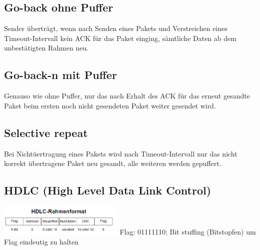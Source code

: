 \documentclass[fs, footer]{latex4ei}
\begin{document}
\begin{multicols*}{4}
{	\subsection{Go-back ohne Puffer} 
		Sender überträgt, wenn nach Senden eines Pakets und Verstreichen eines Timeout-Intervall kein ACK für das Paket einging, sämtliche Daten ab dem unbestätigten Rahmen neu. \\

	\subsection{Go-back-n mit Puffer} 
		Genauso wie ohne Puffer, nur das nach Erhalt des ACK für das erneut gesandte Paket beim ersten noch nicht gesendeten Paket weiter gesendet wird. \\
	
	\subsection{Selective repeat}
		Bei Nichtüertragung eines Pakets wird nach Timeout-Intervall nur das nicht korrekt übertragene Paket neu gesandt, alle weiteren werden gepuffert. \\
	
	\subsection{HDLC (High Level Data Link Control)} 

		\includegraphics[width = 6cm]{./img/HDLC_Rahmen.png}
		Flag: 01111110; Bit stuffing (Bitstopfen) um Flag eindeutig zu halten\\
}

\end{multicols*}
\end{document}
